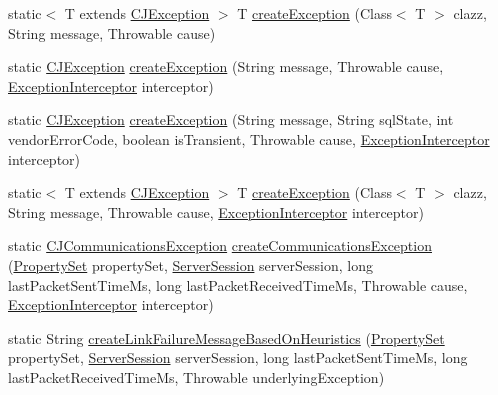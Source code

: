 \begin{DoxyCompactItemize}
static$<$ T extends \mbox{\hyperlink{classcom_1_1mysql_1_1cj_1_1exceptions_1_1_c_j_exception}{C\+J\+Exception}} $>$ T \mbox{\hyperlink{classcom_1_1mysql_1_1cj_1_1exceptions_1_1_exception_factory_abdd488af1199e60637c17ee9bbb5d6cd}{create\+Exception}} (Class$<$ T $>$ clazz, String message, Throwable cause)
\item 
static \mbox{\hyperlink{classcom_1_1mysql_1_1cj_1_1exceptions_1_1_c_j_exception}{C\+J\+Exception}} \mbox{\hyperlink{classcom_1_1mysql_1_1cj_1_1exceptions_1_1_exception_factory_a34c3a1eeedc214e84877e21b46ecb987}{create\+Exception}} (String message, Throwable cause, \mbox{\hyperlink{interfacecom_1_1mysql_1_1cj_1_1exceptions_1_1_exception_interceptor}{Exception\+Interceptor}} interceptor)
\item 
static \mbox{\hyperlink{classcom_1_1mysql_1_1cj_1_1exceptions_1_1_c_j_exception}{C\+J\+Exception}} \mbox{\hyperlink{classcom_1_1mysql_1_1cj_1_1exceptions_1_1_exception_factory_aef1a90d20ca0bc44c8f13775f9a6a9ac}{create\+Exception}} (String message, String sql\+State, int vendor\+Error\+Code, boolean is\+Transient, Throwable cause, \mbox{\hyperlink{interfacecom_1_1mysql_1_1cj_1_1exceptions_1_1_exception_interceptor}{Exception\+Interceptor}} interceptor)
\item 
static$<$ T extends \mbox{\hyperlink{classcom_1_1mysql_1_1cj_1_1exceptions_1_1_c_j_exception}{C\+J\+Exception}} $>$ T \mbox{\hyperlink{classcom_1_1mysql_1_1cj_1_1exceptions_1_1_exception_factory_a3f60b3a0bdec23f573ae589ada6c5c1e}{create\+Exception}} (Class$<$ T $>$ clazz, String message, Throwable cause, \mbox{\hyperlink{interfacecom_1_1mysql_1_1cj_1_1exceptions_1_1_exception_interceptor}{Exception\+Interceptor}} interceptor)
\item 
static \mbox{\hyperlink{classcom_1_1mysql_1_1cj_1_1exceptions_1_1_c_j_communications_exception}{C\+J\+Communications\+Exception}} \mbox{\hyperlink{classcom_1_1mysql_1_1cj_1_1exceptions_1_1_exception_factory_a227f3097e48f66392c93399bae8fa2ce}{create\+Communications\+Exception}} (\mbox{\hyperlink{interfacecom_1_1mysql_1_1cj_1_1conf_1_1_property_set}{Property\+Set}} property\+Set, \mbox{\hyperlink{interfacecom_1_1mysql_1_1cj_1_1protocol_1_1_server_session}{Server\+Session}} server\+Session, long last\+Packet\+Sent\+Time\+Ms, long last\+Packet\+Received\+Time\+Ms, Throwable cause, \mbox{\hyperlink{interfacecom_1_1mysql_1_1cj_1_1exceptions_1_1_exception_interceptor}{Exception\+Interceptor}} interceptor)
\item 
static String \mbox{\hyperlink{classcom_1_1mysql_1_1cj_1_1exceptions_1_1_exception_factory_a5d9a3b82bd67fb7fe341fd7120e78989}{create\+Link\+Failure\+Message\+Based\+On\+Heuristics}} (\mbox{\hyperlink{interfacecom_1_1mysql_1_1cj_1_1conf_1_1_property_set}{Property\+Set}} property\+Set, \mbox{\hyperlink{interfacecom_1_1mysql_1_1cj_1_1protocol_1_1_server_session}{Server\+Session}} server\+Session, long last\+Packet\+Sent\+Time\+Ms, long last\+Packet\+Received\+Time\+Ms, Throwable underlying\+Exception)
\end{DoxyCompactItemize}


